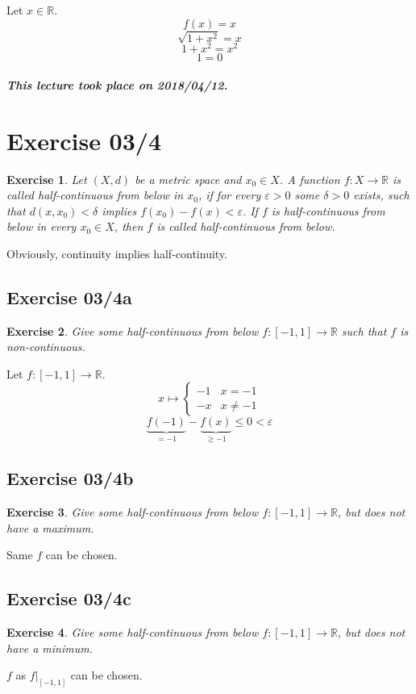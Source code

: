 \documentclass{article}
\newtheorem{ex}{Exercise} %
\newcommand{\dateref}[1]{\paragraph{\textit{This lecture took place on #1.}}}
\begin{document}
Let $x \in \mathbb R$.
\[ f(x) = x \]
\[ \sqrt{1 + x^2} = x \]
\[ 1 + x^2 = x^2 \]
\[ 1 = 0 \]

\dateref{2018/04/12}

\section{Exercise 03/4}
\begin{ex}
  Let $(X, d)$ be a metric space and $x_0 \in X$. A function $f: X \to \mathbb R$ is called half-continuous from below in $x_0$, if for every $\varepsilon > 0$ some $\delta > 0$ exists, such that $d(x, x_0) < \delta$ implies $f(x_0) - f(x) < \varepsilon$. If $f$ is half-continuous from below in every $x_0 \in X$, then $f$ is called half-continuous from below.
\end{ex}

Obviously, continuity implies half-continuity.

\subsection{Exercise 03/4a}
\begin{ex}
  Give some half-continuous from below $f: [-1, 1] \to \mathbb R$ such that $f$ is non-continuous.
\end{ex}

Let $f: [-1,1] \to \mathbb R$.
\[
  x \mapsto \begin{cases}
    -1 & x = -1 \\
    -x & x \neq -1
  \end{cases}
\]
\[ \underbrace{f(-1)}_{=-1} - \underbrace{f(x)}_{\geq -1} \leq 0 < \varepsilon \]

\subsection{Exercise 03/4b}
\begin{ex}
  Give some half-continuous from below $f: [-1, 1] \to \mathbb R$, but does not have a maximum.
\end{ex}
Same $f$ can be chosen.

\subsection{Exercise 03/4c}
\begin{ex}
  Give some half-continuous from below $f: [-1, 1] \to \mathbb R$, but does not have a minimum.
\end{ex}
$f$ as $f|_{[-1,1]}$ can be chosen.
\end{document}
